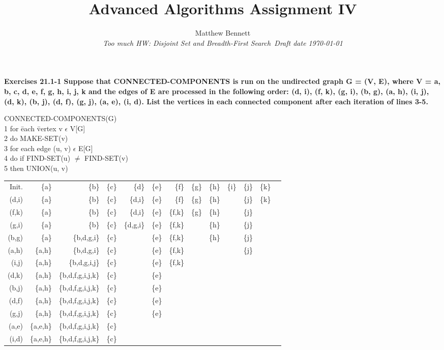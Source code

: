 \documentclass[10pt,fullpage]{article}
\title{ Advanced Algorithms Assignment IV }
\author{Matthew Bennett \\
{\small\em Too much HW: Disjoint Set and Breadth-First Search\ Draft
date \today }}
\date{ }
\begin{document}
\maketitle

\textbf{Exercises 21.1-1 Suppose that CONNECTED-COMPONENTS is run on
the undirected graph G = (V, E), where V = {a, b, c, d, e, f, g, h,
i, j, k} and the edges of E are processed in the following order:
(d, i), (f, k), (g, i), (b, g), (a, h), (i, j), (d, k), (b, j), (d,
f), (g, j), (a, e), (i, d). List the vertices in each connected
component after each iteration of lines 3-5. }
\begin{tabbing}
CONNECTED-COMPONENTS(G)\\
1 for \= each \= vertex v $\epsilon$ V[G]\\
2 \> do MAKE-SET(v)\\
3 for each edge (u, v) $\epsilon$ E[G]\\
4 \> do if FIND-SET(u) $\neq$ FIND-SET(v)\\
5 \> \> then UNION(u, v)\\
\end{tabbing}

\begin{tabular}{|r|r|r|r|r|r|r|r|r|r|r|r|r|}
  \hline
  Init. & \{a\} & \{b\} & \{c\} & \{d\} & \{e\} & \{f\} & \{g\} & \{h\} & \{i\} & \{j\} & \{k\} \\
  (d,i) & \{a\} & \{b\} & \{c\} & \{d,i\} & \{e\} & \{f\} & \{g\} & \{h\} &  & \{j\} & \{k\} \\
  (f,k) & \{a\} & \{b\} & \{c\} & \{d,i\} & \{e\} & \{f,k\} & \{g\} & \{h\} &  & \{j\} &  \\
  (g,i) & \{a\} & \{b\} & \{c\} & \{d,g,i\} & \{e\} & \{f,k\} & & \{h\} &  & \{j\} &  \\
  (b,g) & \{a\} & \{b,d,g,i\} & \{c\} & & \{e\} & \{f,k\} & & \{h\} &  & \{j\} &  \\
  (a,h) & \{a,h\} & \{b,d,g,i\} & \{c\} & & \{e\} & \{f,k\} & & &  & \{j\} &  \\
  (i,j) & \{a,h\} & \{b,d,g,i,j\} & \{c\} & & \{e\} & \{f,k\} & & &  & &  \\
  (d,k) & \{a,h\} & \{b,d,f,g,i,j,k\} & \{c\} & & \{e\} & & & &  & &  \\
  (b,j) & \{a,h\} & \{b,d,f,g,i,j,k\} & \{c\} & & \{e\} & & & &  & &  \\
  (d,f) & \{a,h\} & \{b,d,f,g,i,j,k\} & \{c\} & & \{e\} & & & &  & &  \\
  (g,j) & \{a,h\} & \{b,d,f,g,i,j,k\} & \{c\} & & \{e\} & & & &  & &  \\
  (a,e) & \{a,e,h\} & \{b,d,f,g,i,j,k\} & \{c\} & & & & & &  & &  \\
  (i,d) & \{a,e,h\} & \{b,d,f,g,i,j,k\} & \{c\} & & & & & &  & &  \\
  \hline
\end{tabular}
\end{document}
